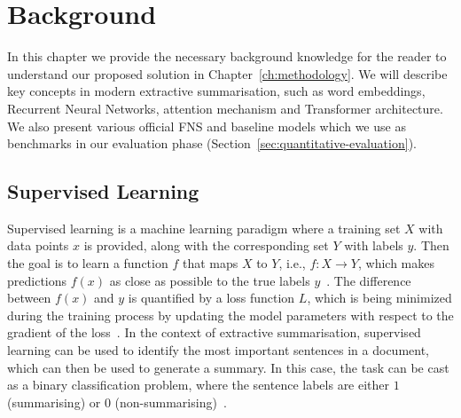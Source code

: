 \chapter{Background}\label{ch:background}
In this chapter we provide the necessary background knowledge for the reader to understand our proposed solution in Chapter~\ref{ch:methodology}.
We will describe key concepts in modern extractive summarisation, such as word embeddings, Recurrent Neural Networks, attention mechanism and Transformer architecture.
We also present various official FNS and baseline models which we use as benchmarks in our evaluation phase (Section~\ref{sec:quantitative-evaluation}).

\section{Supervised Learning}\label{sec:supervised_learning}
Supervised learning is a machine learning paradigm where a training set $X$ with data points $x$ is provided, along with the corresponding set $Y$ with labels $y$.
Then the goal is to learn a function $f$ that maps $X$ to $Y$, i.e., $f: X \rightarrow Y$, which makes predictions $f(x)$ as close as possible to the true labels $y$~\cite{sammut2011encyclopedia}.
The difference between $f(x)$ and $y$ is quantified by a loss function $L$, which is being minimized during the training process by updating the model parameters with respect to the gradient of the loss~\cite{Goodfellow-et-al-2016}.
In the context of extractive summarisation, supervised learning can be used to identify the most important sentences in a document, which can then be used to generate a summary.
In this case, the task can be cast as a binary classification problem, where the sentence labels are either $1$ (summarising) or $0$ (non-summarising)~\cite{manning_raghavan_schutze_2008}.



